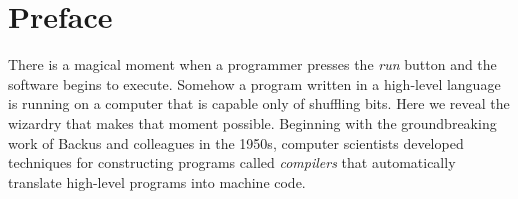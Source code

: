 \documentclass[7x10]{TimesAPriori_MIT}%
\numberwithin{theorem}{chapter}
\numberwithin{definition}{chapter}
\numberwithin{equation}{chapter}
\begin{document}
\begin{copyrightpage}






\end{copyrightpage}

\dedication{This book is dedicated to Katie, my partner in everything,
  my children, who grew up during the writing of this book, and the
  programming language students at Indiana University, whose
  thoughtful questions made this a better book.}



\tableofcontents




\chapter*{Preface}

There is a magical moment when a programmer presses the \emph{run}
button and the software begins to execute. Somehow a program written
in a high-level language is running on a computer that is capable only
of shuffling bits. Here we reveal the wizardry that makes that moment
possible. Beginning with the groundbreaking work of Backus and
colleagues in the 1950s, computer scientists developed techniques for
constructing programs called \emph{compilers} that automatically
translate high-level programs into machine code.
\end{document}
